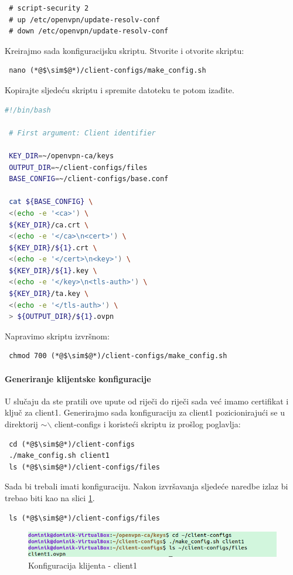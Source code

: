 \begin{lstlisting}
 # script-security 2
 # up /etc/openvpn/update-resolv-conf
 # down /etc/openvpn/update-resolv-conf
\end{lstlisting}
Kreirajmo sada konfiguracijsku skriptu. Stvorite i otvorite skriptu:
\begin{lstlisting}
 nano (*@$\sim$@*)/client-configs/make_config.sh
\end{lstlisting}
Kopirajte sljedeću skriptu i spremite datoteku te potom izađite.
\begin{lstlisting}[language=bash]
 #!/bin/bash
 
 # First argument: Client identifier
 
 KEY_DIR=~/openvpn-ca/keys
 OUTPUT_DIR=~/client-configs/files
 BASE_CONFIG=~/client-configs/base.conf
 
 cat ${BASE_CONFIG} \
 <(echo -e '<ca>') \
 ${KEY_DIR}/ca.crt \
 <(echo -e '</ca>\n<cert>') \
 ${KEY_DIR}/${1}.crt \
 <(echo -e '</cert>\n<key>') \
 ${KEY_DIR}/${1}.key \
 <(echo -e '</key>\n<tls-auth>') \
 ${KEY_DIR}/ta.key \
 <(echo -e '</tls-auth>') \
 > ${OUTPUT_DIR}/${1}.ovpn
\end{lstlisting}
Napravimo skriptu izvršnom:
\begin{lstlisting}
 chmod 700 (*@$\sim$@*)/client-configs/make_config.sh
\end{lstlisting}
\bigbreak
\paragraph*{Generiranje klijentske konfiguracije}
\hfill \smallbreak
U slučaju da ste pratili ove upute od riječi do riječi sada već imamo certifikat i ključ za client1. Generirajmo sada konfiguraciju za client1 pozicionirajući se u direktorij $\sim$$\backslash$ client-configs i koristeći skriptu iz prošlog poglavlja:
\begin{lstlisting}
 cd (*@$\sim$@*)/client-configs
 ./make_config.sh client1
 ls (*@$\sim$@*)/client-configs/files
\end{lstlisting}
Sada bi trebali imati konfiguraciju. Nakon izvršavanja sljedeće naredbe izlaz bi trebao biti kao na slici \ref{fig:screenshot-from-2018-12-14-19-29-50}.
\begin{lstlisting}
 ls (*@$\sim$@*)/client-configs/files
\end{lstlisting}
\begin{figure}[h]
	\centering
	\includegraphics[width=0.7\linewidth]{"slike/OpenVPN/Screenshot from 2018-12-14 19-29-50"}
	\caption[Konfiguracija klijenta - client1]{Konfiguracija klijenta - client1}
	\label{fig:screenshot-from-2018-12-14-19-29-50}
\end{figure}

